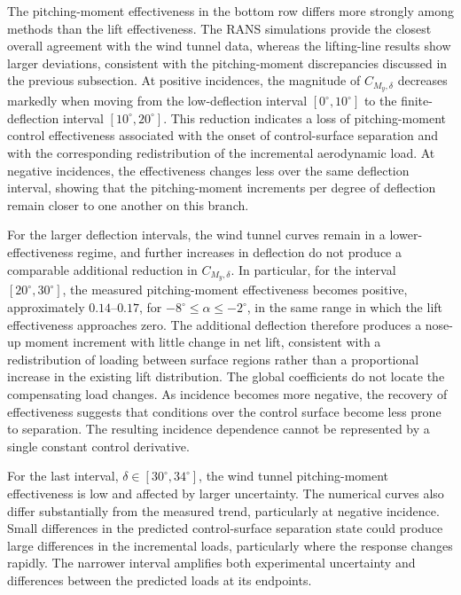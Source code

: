\documentclass[journal ]{new-aiaa}
\begin{document}
The pitching-moment effectiveness in the bottom row differs more strongly among methods than the lift effectiveness.
The RANS simulations provide the closest overall agreement with the wind tunnel data, whereas the lifting-line results show larger deviations, consistent with the pitching-moment discrepancies discussed in the previous subsection.
At positive incidences, the magnitude of \(C_{M_y,\delta}\) decreases markedly when moving from the low-deflection interval \([0^\circ,10^\circ]\) to the finite-deflection interval \([10^\circ,20^\circ]\).
This reduction indicates a loss of pitching-moment control effectiveness associated with the onset of control-surface separation and with the corresponding redistribution of the incremental aerodynamic load.
At negative incidences, the effectiveness changes less over the same deflection interval, showing that the pitching-moment increments per degree of deflection remain closer to one another on this branch.

For the larger deflection intervals, the wind tunnel curves remain in a lower-effectiveness regime, and further increases in deflection do not produce a comparable additional reduction in \(C_{M_y,\delta}\).
In particular, for the interval \([20^\circ,30^\circ]\), the measured pitching-moment effectiveness becomes positive, approximately \(0.14\)--\(0.17\), for \(-8^\circ\leq\alpha\leq-2^\circ\), in the same range in which the lift effectiveness approaches zero.
The additional deflection therefore produces a nose-up moment increment with little change in net lift, consistent with a redistribution of loading between surface regions rather than a proportional increase in the existing lift distribution. The global coefficients do not locate the compensating load changes. As incidence becomes more negative, the recovery of effectiveness suggests that conditions over the control surface become less prone to separation. The resulting incidence dependence cannot be represented by a single constant control derivative.

For the last interval, \(\delta\in[30^\circ,34^\circ]\), the wind tunnel pitching-moment effectiveness is low and affected by larger uncertainty.
The numerical curves also differ substantially from the measured trend, particularly at negative incidence. Small differences in the predicted control-surface separation state could produce large differences in the incremental loads, particularly where the response changes rapidly. The narrower interval amplifies both experimental uncertainty and differences between the predicted loads at its endpoints.
\end{document}
